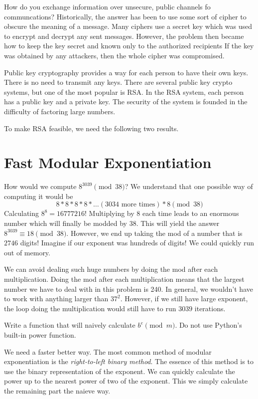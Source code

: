 
How do you exchange information over unsecure, public channels fo communcations?
Historically, the answer has been to use some sort of cipher to obscure the meaning of a message.
Many ciphers use a secret key which was used to encrypt and decrypt any sent messages.
However, the problem then became how to keep the key secret and known only to the authorized recipients
If the key was obtained by any attackers, then the whole cipher was compromised.

Public key cryptography provides a way for each person to have their own keys.
There is no need to transmit any keys.
There are several public key crypto systems, but one of the most popular is RSA.
In the RSA system, each person has a public key and a private key.
The security of the system is founded in the difficulty of factoring large numbers.

To make RSA feasible, we need the following two results.
\section*{Fast Modular Exponentiation}
How would we compute $8^{3039} \pmod{38}$?
We understand that one possible way of computing it would be
\[
8*8*8*8*\dots (3034 \text{ more times}) *8 \pmod{38}
\]
Calculating $8^8 = 16777216$!
Multiplying by $8$ each time leads to an enormous number which will finally be modded by $38$.
This will yield the answer $8^{3039} \equiv 18 \pmod{38}$.
However, we end up taking the mod of a number that is $2746$ digits!
Imagine if our exponent was hundreds of digits!
We could quickly run out of memory.

We can avoid dealing such huge numbers by doing the mod after each multiplication.
Doing the mod after each multiplication means that the largest number we have to deal with in this problem is 240.
In general, we wouldn't have to work with anything larger than $37^{2}$.
However, if we still have large exponent, the loop doing the multiplication would still have to run $3039$ iterations.

\begin{problem}
Write a function that will naively calculate $b^{e} \pmod{m}$.
Do not use Python's built-in power function.
\label{prob:naivepower}
\end{problem}

We need a faster better way.
The most common method of modular exponentiation is the \emph{right-to-left binary method}.
The essence of this method is to use the binary representation of the exponent.
We can quickly calculate the power up to the nearest power of two of the exponent.
This we simply calculate the remaining part the naieve way.

